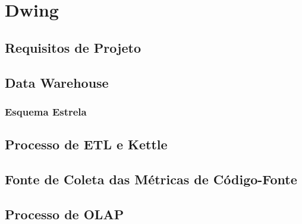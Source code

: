 \chapter{Dwing}

\section{Requisitos de Projeto}
\section{Data Warehouse}

\subsection{Esquema Estrela}


\section{Processo de ETL e Kettle}

\section{Fonte de Coleta das Métricas de Código-Fonte}


\section{Processo de OLAP}